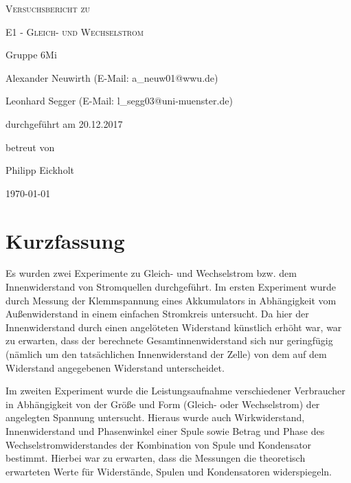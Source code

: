 \documentclass[
	a4paper,
	12pt,
	pagesize,
	ngerman
]{scrartcl}
\begin{document}
	
	\begin{titlepage}
		\centering
		{\scshape\LARGE Versuchsbericht zu \par}
		\vspace{1cm}
		{\scshape\huge E1 - Gleich- und Wechselstrom\par}
		\vspace{2.5cm}
		{\LARGE Gruppe 6Mi \par}
		\vspace{0.5cm}
		
		{\large Alexander Neuwirth (E-Mail: a\_neuw01@wwu.de) \par}
		{\large Leonhard Segger (E-Mail: l\_segg03@uni-muenster.de) \par}
		\vfill
		
		durchgeführt am 20.12.2017\par 
		betreut von\par
		{\large Philipp Eickholt} %
		
		\vfill
		
		{\large \today\par}
	\end{titlepage}
	\tableofcontents
	\newpage


	\section{Kurzfassung}
	Es wurden zwei Experimente zu Gleich- und Wechselstrom bzw. dem Innenwiderstand von Stromquellen durchgeführt.
	Im ersten Experiment wurde durch Messung der Klemmspannung eines Akkumulators in Abhängigkeit vom Außenwiderstand in einem einfachen Stromkreis untersucht.
	Da hier der Innenwiderstand durch einen angelöteten Widerstand künstlich erhöht war, war zu erwarten, dass der berechnete Gesamtinnenwiderstand sich nur geringfügig (nämlich um den tatsächlichen Innenwiderstand der Zelle) von dem auf dem Widerstand angegebenen Widerstand unterscheidet. %
	\par 
	Im zweiten Experiment wurde die Leistungsaufnahme verschiedener Verbraucher in Abhängigkeit von der Größe und Form (Gleich- oder Wechselstrom) der angelegten Spannung untersucht.
	Hieraus wurde auch Wirkwiderstand, Innenwiderstand und Phasenwinkel einer Spule sowie Betrag und Phase des Wechselstromwiderstandes der Kombination von Spule und Kondensator bestimmt. %
	Hierbei war zu erwarten, dass die Messungen die theoretisch erwarteten Werte für Widerstände, Spulen und Kondensatoren widerspiegeln. %
	
\end{document}
